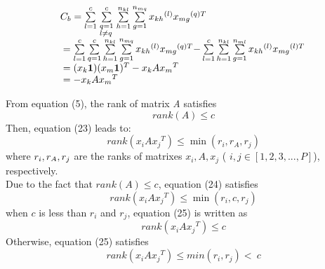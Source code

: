 \documentclass[10pt,journal,compsoc]{IEEEtran}
\begin{document}
\begin{equation} \begin{array}{l}
{C_b} = \sum\limits_{l = 1}^c {\sum\limits_{\scriptstyle q = 1\hfill\atop
\scriptstyle l \ne q\hfill}^c {\sum\limits_{h = 1}^{{n_{kl}}} {\sum\limits_{g = 1}^{{n_{mq}}} {{x_{kh}}^{(l)}{x_{mg}}^{(q)T}} } } } \\
{\rm{    }} = \sum\limits_{l = 1}^c {\sum\limits_{q = 1}^c {\sum\limits_{h = 1}^{{n_{kl}}} {\sum\limits_{g = 1}^{{n_{mq}}} {{x_{kh}}^{(l)}{x_{mg}}^{(q)T} - } } } } \sum\limits_{l = 1}^c {\sum\limits_{h = 1}^{{n_{kl}}} {\sum\limits_{g = 1}^{{n_{ml}}} {{x_{kh}}^{(l)}{x_{mg}}^{(l)T}} } } \\
{\rm{    }} = ({x_k}{\bf{1}}){({x_m}{\bf{1}})^T} - {x_k}A{x_m}^T\\
{\rm{    }} =  - {x_k}A{x_m}^T
\end{array} \end{equation}


From equation (5), the rank of matrix \emph{A} satisfies
\begin{equation} \ rank(A) \le c \end{equation}
Then, equation (23) leads to:
\begin{equation} \ rank({x_i}A{x_j}^T) \le \min ({r_i},{r_A},{r_j}) \end{equation}
where ${r_i},{\rm{  }}{r_A},{\rm{  }}{r_j}$ are the ranks of matrixes ${x_i},A,{x_j}$ (
$ i,j \in [1,2,3,...,P] $), respectively.\\
Due to the fact that $rank(A) \le c$, equation (24) satisfies
\begin{equation} \ rank({x_i}A{x_j}^T) \le \min ({r_i},{c},{r_j}) \end{equation}
when $c$ is less than ${r_i}$ and ${r_j}$, equation (25) is written as
\begin{equation} \ rank({x_i}A{x_j}^T) \le {c} \end{equation}
Otherwise, equation (25) satisfies
\begin{equation} \ rank({x_i}A{x_j}^T) \le min({r_i,r_j}) <\ {c} \end{equation}
\end{document}
